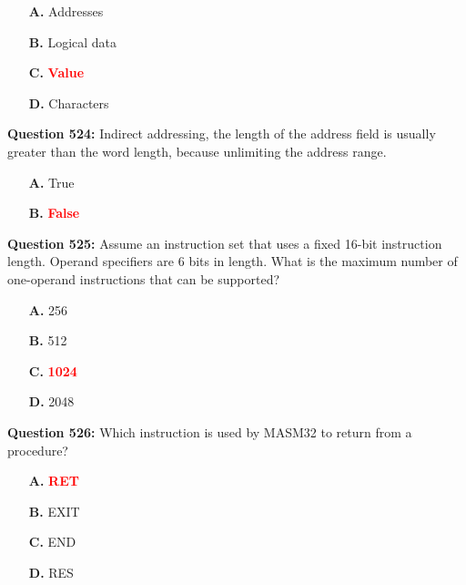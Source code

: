 \documentclass[12pt,a4paper]{article}
\begin{document}
\begin{itemize}
    \item[\textbf{A.}] Addresses
    \item[\textbf{B.}] Logical data
    \item[\textbf{C.}] \textcolor{red}{\textbf{Value}}
    \item[\textbf{D.}] Characters
\end{itemize}

\vspace{0.5cm}

\textbf{Question 524:} Indirect addressing, the length of the address field is usually greater than the word length, because unlimiting the address range.

\begin{itemize}
    \item[\textbf{A.}] True
    \item[\textbf{B.}] \textcolor{red}{\textbf{False}}
\end{itemize}

\vspace{0.5cm}

\textbf{Question 525:} Assume an instruction set that uses a fixed 16-bit instruction length. Operand specifiers are 6 bits in length. What is the maximum number of one-operand instructions that can be supported?

\begin{itemize}
    \item[\textbf{A.}] 256
    \item[\textbf{B.}] 512
    \item[\textbf{C.}] \textcolor{red}{\textbf{1024}}
    \item[\textbf{D.}] 2048
\end{itemize}

\vspace{0.5cm}

\textbf{Question 526:} Which instruction is used by MASM32 to return from a procedure?

\begin{itemize}
    \item[\textbf{A.}] \textcolor{red}{\textbf{RET}}
    \item[\textbf{B.}] EXIT
    \item[\textbf{C.}] END
    \item[\textbf{D.}] RES
\end{itemize}

\vspace{0.5cm}
\end{document}
